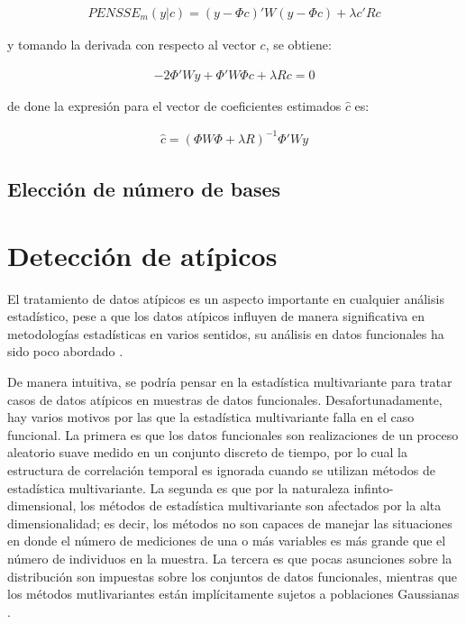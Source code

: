 \documentclass[
]{book}
\begin{document}
\begin{align*}
    PENSSE_m(y|c)=(y-\Phi c)'W(y-\Phi c)+\lambda c'Rc
\end{align*}

y tomando la derivada con respecto al vector \(c\), se obtiene:

\begin{align*}
    -2\Phi'Wy + \Phi' W \Phi c + \lambda R c=0
\end{align*}

de done la expresión para el vector de coeficientes estimados \(\hat{c}\) es:

\begin{align*}
    \hat{c}=(\Phi W \Phi + \lambda R)^{-1} \Phi' Wy
\end{align*}

\hypertarget{elecciuxf3n-de-nuxfamero-de-bases}{%
\subsection{Elección de número de bases}\label{elecciuxf3n-de-nuxfamero-de-bases}}

\hypertarget{detecciuxf3n-de-atuxedpicos}{%
\section{Detección de atípicos}\label{detecciuxf3n-de-atuxedpicos}}

El tratamiento de datos atípicos es un aspecto importante en cualquier análisis estadístico, pese a que los datos atípicos influyen de manera significativa en metodologías estadísticas en varios sentidos, su análisis en datos funcionales ha sido poco abordado \citep{oviedo}.

De manera intuitiva, se podría pensar en la estadística multivariante para tratar casos de datos atípicos en muestras de datos funcionales. Desafortunadamente, hay varios motivos por las que la estadística multivariante falla en el caso funcional. La primera es que los datos funcionales son realizaciones de un proceso aleatorio suave medido en un conjunto discreto de tiempo, por lo cual la estructura de correlación temporal es ignorada cuando se utilizan métodos de estadística multivariante. La segunda es que por la naturaleza infinto-dimensional, los métodos de estadística multivariante son afectados por la alta dimensionalidad; es decir, los métodos no son capaces de manejar las situaciones en donde el número de mediciones de una o más variables es más grande que el número de individuos en la muestra. La tercera es que pocas asunciones sobre la distribución son impuestas sobre los conjuntos de datos funcionales, mientras que los métodos mutlivariantes están implícitamente sujetos a poblaciones Gaussianas \citep{oviedo}.
\end{document}
